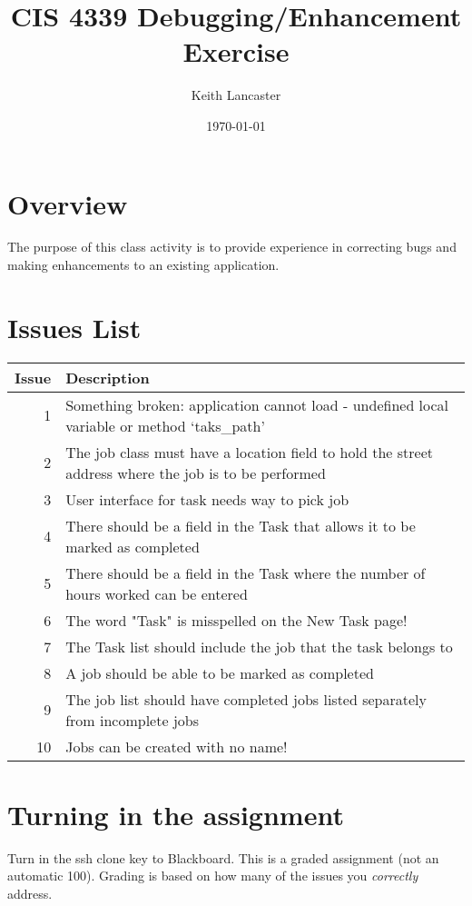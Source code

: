 \documentclass[11pt]{article}
\author{Keith Lancaster}
\date{\today}
\title{CIS 4339 Debugging/Enhancement Exercise}
\begin{document}
\maketitle

\section*{Overview}
\label{sec:org0311bdf}

The purpose of this class activity is to provide experience in correcting bugs and making enhancements to an existing application.

\section*{Issues List}
\label{sec:orgc9a14d3}

\begin{center}
\begin{tabular}{rl}
Issue & Description\\
\hline
1 & Something broken: application cannot load - undefined local variable or method `taks\_path'\\
2 & The job class must have a location field to hold the street address where the job is to be performed\\
3 & User interface for task needs way to pick job\\
4 & There should be a field in the Task that allows it to be marked as completed\\
5 & There should be a field in the Task where the number of hours worked can be entered\\
6 & The word "Task" is misspelled on the New Task page!\\
7 & The Task list should include the job that the task belongs to\\
8 & A job should be able to be marked as completed\\
9 & The job list should have completed jobs listed separately from incomplete jobs\\
10 & Jobs can be created with no name!\\
\end{tabular}
\end{center}

\section*{Turning in the assignment}
\label{sec:org491ba4c}
Turn in the ssh clone key to Blackboard. This is a graded assignment (not an automatic 100). Grading is based on how many of the issues you \emph{correctly} address.
\end{document}
